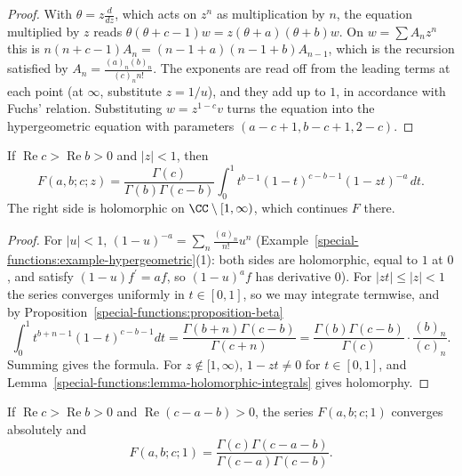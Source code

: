 \begin{proof}
With $\theta = z\frac{d}{dz}$, which acts on $z^n$ as multiplication by $n$, the equation multiplied by $z$ reads $\theta(\theta + c - 1)w = z(\theta + a)(\theta + b)w$. On $w = \sum A_nz^n$ this is
$n(n + c - 1)A_n = (n - 1 + a)(n - 1 + b)A_{n-1}$, which is the recursion satisfied by $A_n = \frac{(a)_n(b)_n}{(c)_nn!}$. The exponents are read off from the leading terms at each point (at $\infty$, substitute $z = 1/u$),
and they add up to $1$, in accordance with Fuchs' relation. Substituting $w = z^{1-c}v$ turns the equation into the hypergeometric equation with parameters $(a - c + 1, b - c + 1, 2 - c)$.
\end{proof}

\begin{theorem}\label{special-functions:theorem-euler-integral}
If $\operatorname{Re}c > \operatorname{Re}b > 0$ and $|z| < 1$, then
\[
F(a, b; c; z) = \frac{\Gamma(c)}{\Gamma(b)\Gamma(c - b)}\int_0^1t^{b-1}(1 - t)^{c-b-1}(1 - zt)^{-a}\,dt.
\]
The right side is holomorphic on $\CC \setminus [1, \infty)$, which continues $F$ there.
\end{theorem}

\begin{proof}
For $|u| < 1$, $(1 - u)^{-a} = \sum_n\frac{(a)_n}{n!}u^n$ (Example~\ref{special-functions:example-hypergeometric}(1): both sides are holomorphic, equal to $1$ at $0$, and satisfy $(1 - u)f^{\prime} = af$, so $(1 - u)^af$ has derivative $0$).
For $|zt| \leq |z| < 1$ the series converges uniformly in $t \in [0, 1]$, so we may integrate termwise, and by Proposition~\ref{special-functions:proposition-beta}
\[
\int_0^1t^{b+n-1}(1 - t)^{c-b-1}dt = \frac{\Gamma(b + n)\Gamma(c - b)}{\Gamma(c + n)} = \frac{\Gamma(b)\Gamma(c - b)}{\Gamma(c)}\cdot\frac{(b)_n}{(c)_n}.
\]
Summing gives the formula. For $z \notin [1, \infty)$, $1 - zt \neq 0$ for $t \in [0, 1]$, and Lemma~\ref{special-functions:lemma-holomorphic-integrals} gives holomorphy.
\end{proof}

\begin{theorem}[Gauss]\label{special-functions:theorem-gauss-summation}
If $\operatorname{Re}c > \operatorname{Re}b > 0$ and $\operatorname{Re}(c - a - b) > 0$, the series $F(a, b; c; 1)$ converges absolutely and
\[
F(a, b; c; 1) = \frac{\Gamma(c)\Gamma(c - a - b)}{\Gamma(c - a)\Gamma(c - b)}.
\]
\end{theorem}

